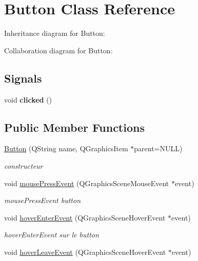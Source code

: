 \hypertarget{class_button}{}\section{Button Class Reference}
\label{class_button}


Inheritance diagram for Button\+:


Collaboration diagram for Button\+:
\subsection*{Signals}
\begin{DoxyCompactItemize}
\item 
\mbox{\label{class_button_a9e7ab4152cb1e7e3beb7f2842f32670c}} 
void {\bfseries clicked} ()
\end{DoxyCompactItemize}
\subsection*{Public Member Functions}
\begin{DoxyCompactItemize}
\item 
\mbox{\hyperlink{class_button_a69976e5c00874a3807b642f249c1c776}{Button}} (Q\+String name, Q\+Graphics\+Item $\ast$parent=N\+U\+LL)
\begin{DoxyCompactList}\small\item\em constructeur \end{DoxyCompactList}\item 
void \mbox{\hyperlink{class_button_a17d8eb0c904605b223bbc00c75655315}{mouse\+Press\+Event}} (Q\+Graphics\+Scene\+Mouse\+Event $\ast$event)
\begin{DoxyCompactList}\small\item\em mouse\+Press\+Event button \end{DoxyCompactList}\item 
void \mbox{\hyperlink{class_button_a633a9684818bc5d300a622a00064f09c}{hover\+Enter\+Event}} (Q\+Graphics\+Scene\+Hover\+Event $\ast$event)
\begin{DoxyCompactList}\small\item\em hover\+Enter\+Event sur le button \end{DoxyCompactList}\item 
void \mbox{\hyperlink{class_button_a1689a97690d9469ce8350d24db0d7485}{hover\+Leave\+Event}} (Q\+Graphics\+Scene\+Hover\+Event $\ast$event)
\end{DoxyCompactItemize}


